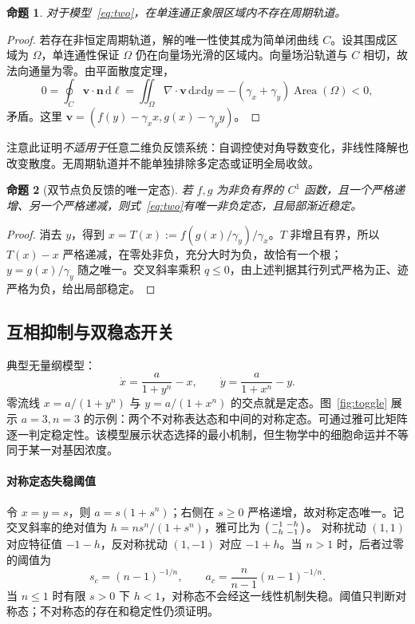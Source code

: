 \documentclass[11pt,a4paper,UTF8,fontset=fandol]{ctexart}
\newtheorem{proposition}{命题}[section]
\newcommand{\dd}{\mathrm d}\newcommand{\R}{\mathbb R}\newcommand{\ssv}{\mathrm{ss}}
\begin{document}
\begin{proposition}对于模型~\eqref{eq:two}，在单连通正象限区域内不存在周期轨道。\end{proposition}
\begin{proof}
若存在非恒定周期轨道，解的唯一性使其成为简单闭曲线 $C$。设其围成区域为 $\Omega$，单连通性保证 $\Omega$ 仍在向量场光滑的区域内。向量场沿轨道与 $C$ 相切，故法向通量为零。由平面散度定理，
\[
0=\oint_C\bm v\cdot\bm n\,\dd\ell
=\iint_\Omega\nabla\cdot\bm v\,\dd x\dd y
=-(\gamma_x+\gamma_y)\operatorname{Area}(\Omega)<0,
\]
矛盾。这里 $\bm v=(f(y)-\gamma_xx,g(x)-\gamma_yy)$。
\end{proof}
注意此证明\emph{不适用于}任意二维负反馈系统：自调控使对角导数变化，非线性降解也改变散度。无周期轨道并不能单独排除多定态或证明全局收敛。

\begin{proposition}[双节点负反馈的唯一定态]
若 $f,g$ 为非负有界的 $C^1$ 函数，且一个严格递增、另一个严格递减，则式~\eqref{eq:two}有唯一非负定态，且局部渐近稳定。
\end{proposition}
\begin{proof}
消去 $y$，得到 $x=T(x):=f(g(x)/\gamma_y)/\gamma_x$。$T$ 非增且有界，所以 $T(x)-x$ 严格递减，在零处非负，充分大时为负，故恰有一个根；$y=g(x)/\gamma_y$ 随之唯一。交叉斜率乘积 $q\leq0$，由上述判据其行列式严格为正、迹严格为负，给出局部稳定。
\end{proof}

\subsection{互相抑制与双稳态开关}
典型无量纲模型：
\begin{equation}\dot x=\frac{a}{1+y^n}-x,\qquad\dot y=\frac{a}{1+x^n}-y.\label{eq:toggle}\end{equation}
零流线 $x=a/(1+y^n)$ 与 $y=a/(1+x^n)$ 的交点就是定态。图~\ref{fig:toggle} 展示 $a=3,n=3$ 的示例：两个不对称表达态和中间的对称定态。可通过雅可比矩阵逐一判定稳定性。该模型展示状态选择的最小机制，但生物学中的细胞命运并不等同于某一对基因浓度。


\paragraph{对称定态失稳阈值}
令 $x=y=s$，则 $a=s(1+s^n)$；右侧在 $s\geq0$ 严格递增，故对称定态唯一。记交叉斜率的绝对值为
$h=ns^n/(1+s^n)$，雅可比为 $\begin{psmallmatrix}-1&-h\\-h&-1\end{psmallmatrix}$。
对称扰动 $(1,1)$ 对应特征值 $-1-h$，反对称扰动 $(1,-1)$ 对应 $-1+h$。当 $n>1$ 时，后者过零的阈值为
\[
s_c=(n-1)^{-1/n},\qquad a_c=\frac n{n-1}(n-1)^{-1/n}.
\]
当 $n\leq1$ 时有限 $s>0$ 下 $h<1$，对称态不会经这一线性机制失稳。阈值只判断对称态；不对称态的存在和稳定性仍须证明。
\end{document}
